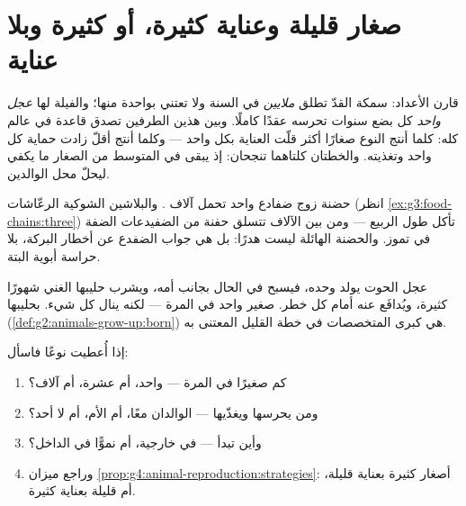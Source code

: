 \section{صغار قليلة وعناية كثيرة، أو كثيرة وبلا عناية}

\begin{proposition}\label{prop:g4:animal-reproduction:strategies}
قارن الأعداد: سمكة القدّ تطلق \emph{ملايين}  في السنة ولا
تعتني بواحدة منها؛ والفيلة لها \emph{عجل واحد} كل بضع سنوات
تحرسه عقدًا كاملًا. وبين هذين الطرفين تصدق قاعدة في عالم 
كله: كلما أنتج النوع صغارًا أكثر قلّت العناية بكل واحد ---
وكلما أنتج أقلّ زادت حماية كل واحد وتغذيته. والخطتان كلتاهما
تنجحان: إذ يبقى في المتوسط من الصغار ما يكفي ليحلّ محل الوالدين.
\end{proposition}
\admitted

\begin{example}[عدّ البركة]\label{ex:g4:animal-reproduction:pondcount}
حضنة زوج ضفادع واحد تحمل آلاف . والبلاشين  الشوكية
 الرعّاشات (انظر \cref{ex:g3:food-chains:three}) تأكل
 طول الربيع --- ومن بين الآلاف تتسلق حفنة من الضفيدعات
الضفة في تموز. والحضنة الهائلة ليست هدرًا: بل هي جواب الضفدع عن
أخطار البركة، بلا حراسة أبوية البتة.
\end{example}

\begin{example}\label{ex:g4:animal-reproduction:whalecalf}
عجل الحوت يولد وحده، فيسبح في الحال بجانب أمه، ويشرب حليبها الغني
شهورًا كثيرة، ويُدافَع عنه أمام كل خطر. صغير واحد في المرة ---
لكنه ينال كل شيء.  بحليبها
(\cref{def:g2:animals-grow-up:born}) هي كبرى المتخصصات في خطة
القليل المعتنى به.
\end{example}

\begin{method}\label{met:g4:animal-reproduction:read}
إذا أُعطيت نوعًا فاسأل:
\begin{enumerate}
  \item كم صغيرًا في المرة --- واحد، أم عشرة، أم آلاف؟
  \item ومن يحرسها ويغذّيها --- الوالدان معًا، أم الأم، أم لا
        أحد؟
  \item وأين تبدأ --- في  خارجية، أم نموًّا في الداخل؟
  \item وراجع ميزان
        \cref{prop:g4:animal-reproduction:strategies}: أصغار
        كثيرة بعناية قليلة، أم قليلة بعناية كثيرة.
\end{enumerate}
\end{method}

